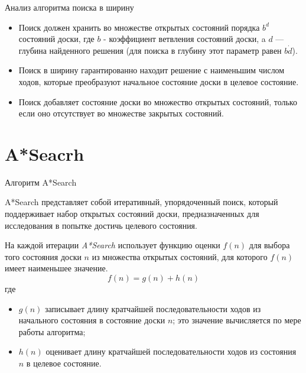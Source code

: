 \documentclass{beamer}
\begin{document}
\begin{frame}{Анализ алгоритма поиска в ширину}
\begin{itemize}
\item Поиск должен хранить во множестве открытых состояний порядка $b^d$ состояний доски, где $b$ - коэффициент ветвления состояний
доски, a $d$ — глубина найденного решения (для поиска в глубину этот параметр равен $b\dot d$). 
\item Поиск в ширину гарантированно находит решение с наименьшим числом
ходов, которые преобразуют начальное состояние доски в целевое состояние.
\item Поиск добавляет состояние доски во множество открытых состояний, только если оно отсутствует во множестве закрытых состояний. 
\end{itemize}
\end{frame}

\section{A*Seacrh}

\begin{frame}{Алгоритм A*Search}
\begin{block}{A*Search}
представляет собой итеративный, упорядоченный поиск, который поддерживает набор открытых состояний доски, предназначенных для исследования в попытке достичь целевого состояния.
\end{block}
На каждой итерации \textit{A*Search} использует функцию оценки $f(n)$ для выбора того состояния доски $n$ из множества открытых состояний, для которого $f(n)$ имеет наименьшее значение.
\[f(n)=g(n)+h(n)\]
где
\begin{itemize}
\item $g(n)$ записывает длину кратчайшей последовательности ходов из начального состояния в состояние доски $n$; это значение вычисляется по мере работы алгоритма;
\item $h(n)$ оценивает длину кратчайшей последовательности ходов из состояния $n$ в целевое состояние.
\end{itemize}
\end{frame}
\end{document}
